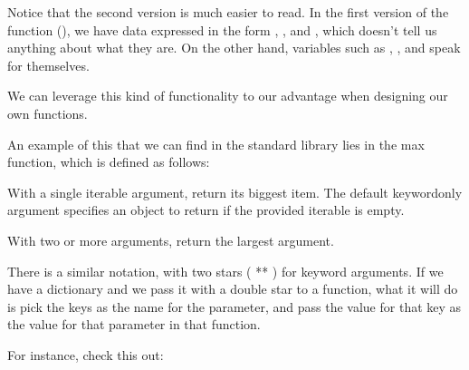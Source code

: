 \documentclass[a4paper,10pt,english]{sphinxmanual}
\begin{document}
Notice that the second version is much easier to read. In the first version of the function
(), we have data expressed in the form , , and , which
doesn’t tell us anything about what they are. On the other hand, variables such as , ,
and  speak for themselves.

We can leverage this kind of functionality to our advantage when designing our own functions.

An example of this that we can find in the standard library lies in the max function, which is defined as
follows:

\begin{sphinxVerbatim}[commandchars=\\\{\}]
 \PYG{p}{[}  \PYG{p}{]}  
   \PYG{p}{[} \PYG{p}{]}  
\end{sphinxVerbatim}

With a single iterable argument, return its biggest item. The default keyword\sphinxhyphen{}only argument specifies an
object to return if the provided iterable is empty.

With two or more arguments, return the largest argument.

There is a similar notation, with two stars ( ** ) for keyword arguments. If we have a dictionary and we pass
it with a double star to a function, what it will do is pick the keys as the name for the parameter, and pass
the value for that key as the value for that parameter in that function.

For instance, check this out:

\begin{sphinxVerbatim}[commandchars=\\\{\}]
 
\end{sphinxVerbatim}
\end{document}
